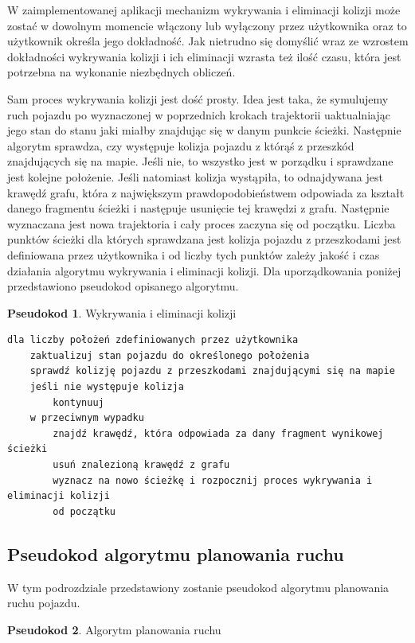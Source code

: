 \documentclass[a4paper,11pt,twoside]{report}
\theoremstyle{definition}
\newtheorem{pseudokod}{Pseudokod}[subsection]
\begin{document}
W zaimplementowanej aplikacji mechanizm wykrywania i eliminacji kolizji może zostać w dowolnym momencie włączony lub wyłączony przez użytkownika oraz to użytkownik określa jego dokładność. Jak nietrudno się domyślić wraz ze wzrostem dokładności wykrywania kolizji i ich eliminacji wzrasta też ilość czasu, która jest potrzebna na wykonanie niezbędnych obliczeń. 

Sam proces wykrywania kolizji jest dość prosty. Idea jest taka, że symulujemy ruch pojazdu po wyznaczonej w poprzednich krokach trajektorii uaktualniając jego stan do stanu jaki miałby znajdując się w danym punkcie ścieżki. Następnie algorytm sprawdza, czy występuje kolizja pojazdu z którąś z przeszkód znajdujących się na mapie. Jeśli nie, to wszystko jest w porządku i sprawdzane jest kolejne położenie. Jeśli natomiast kolizja wystąpiła, to odnajdywana jest krawędź grafu, która z największym prawdopodobieństwem odpowiada za kształt danego fragmentu ścieżki i następuje usunięcie tej krawędzi z grafu. Następnie wyznaczana jest nowa trajektoria i cały proces zaczyna się od początku. Liczba punktów ścieżki dla których sprawdzana jest kolizja pojazdu z przeszkodami jest definiowana przez użytkownika i od liczby tych punktów zależy jakość i czas działania algorytmu wykrywania i eliminacji kolizji. Dla uporządkowania poniżej przedstawiono pseudokod opisanego algorytmu.

\begin{pseudokod}
Wykrywania i eliminacji kolizji
\begin{verbatim}
dla liczby położeń zdefiniowanych przez użytkownika
    zaktualizuj stan pojazdu do określonego położenia
    sprawdź kolizję pojazdu z przeszkodami znajdującymi się na mapie
    jeśli nie występuje kolizja
        kontynuuj
    w przeciwnym wypadku
        znajdź krawędź, która odpowiada za dany fragment wynikowej ścieżki
        usuń znalezioną krawędź z grafu
        wyznacz na nowo ścieżkę i rozpocznij proces wykrywania i eliminacji kolizji 
        od początku
\end{verbatim}
\end{pseudokod}

\subsection{Pseudokod algorytmu planowania ruchu}

W tym podrozdziale przedstawiony zostanie pseudokod algorytmu planowania ruchu pojazdu.

\begin{pseudokod}
Algorytm planowania ruchu
\begin{verbatim}

\end{verbatim}
\end{pseudokod}
\end{document}
